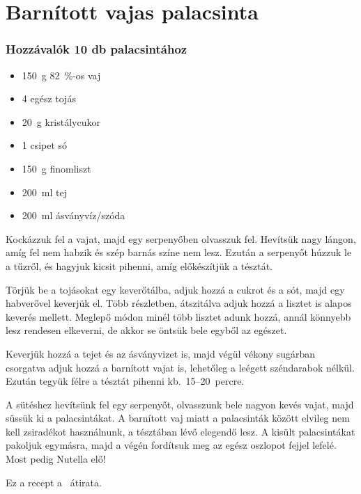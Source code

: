 \newpage
\section*{Barnított vajas palacsinta} \label{sec:barnitott-vajas-palacsinta}

\subsubsection*{Hozzávalók 10 db palacsintához}
\begin{itemize}
    \item \qty{150}{\g} \qty{82}{\percent}-os vaj
    \item \num{4} egész tojás
    \item \qty{20}{\g} kristálycukor
    \item \num{1} csipet só
    \item \qty{150}{\g} finomliszt
    \item \qty{200}{\ml} tej
    \item \qty{200}{\ml} ásványvíz/szóda
\end{itemize}

Kockázzuk fel a vajat, majd egy serpenyőben olvasszuk fel. Hevítsük nagy lángon, amíg fel nem habzik és szép barnás színe nem lesz. Ezután a serpenyőt húzzuk le a tűzről, és hagyjuk kicsit pihenni, amíg előkészítjük a tésztát.

Törjük be a tojásokat egy keverőtálba, adjuk hozzá a cukrot és a sót, majd egy habverővel keverjük el. Több részletben, átszitálva adjuk hozzá a lisztet is alapos keverés mellett. Meglepő módon minél több lisztet adunk hozzá, annál könnyebb lesz rendesen elkeverni, de akkor se öntsük bele egyből az egészet.

Keverjük hozzá a tejet és az ásványvizet is, majd végül vékony sugárban csorgatva adjuk hozzá a barnított vajat is, lehetőleg a leégett széndarabok nélkül. Ezután tegyük félre a tésztát pihenni kb.~\numrange{15}{20}~percre.

A sütéshez hevítsünk fel egy serpenyőt, olvasszunk bele nagyon kevés vajat, majd süssük ki a palacsintákat. A barnított vaj miatt a palacsinták között elvileg nem kell zsiradékot használnunk, a tésztában lévő elegendő lesz. A kisült palacsintákat pakoljuk egymásra, majd a végén fordítsuk meg az egész oszlopot fejjel lefelé. Most pedig Nutella elő!

Ez a recept a~\cite{szell_palacsinta} átirata.
